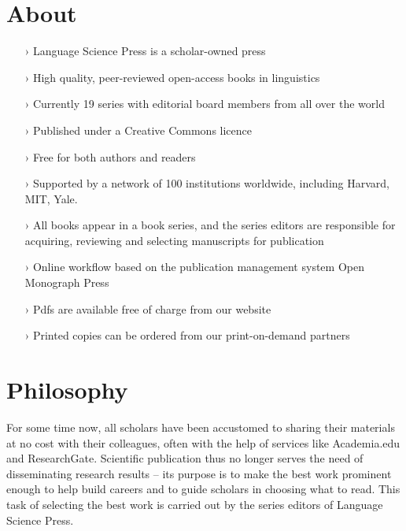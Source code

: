 \documentclass[
notumble,
nofoldmark,
]{leaflet}
\begin{document}
      
\newpage
\section{\sffamily\Large\bfseries About} 
\begin{itemize}  
\setlength{\itemsep}{-3pt} 
 \item[›] Language Science Press is a scholar-owned press
\item[›]  High quality, peer-reviewed open-access books in linguistics
\item[›] Currently 19 series with editorial board members from all over the world
 \item[›] Published under a Creative Commons licence
\item[›] Free for both authors and readers
 \item[›] Supported by a network of 100 institutions worldwide, including Harvard, MIT, Yale. 

 \item[›] All books appear in a book series, and the series editors are responsible for acquiring, reviewing and selecting manuscripts for publication
 \item[›] Online workflow based on the publication management system Open Monograph Press
 \item[›] Pdfs are available free of charge from our website 
 \item[›] Printed copies can be ordered from our print-on-demand partners
\end{itemize}
 
 \section{\sffamily\Large\bfseries Philosophy} 
 For some time now, all scholars have been accustomed to sharing their materials at no cost with their colleagues, often with the help of services like Academia.edu and ResearchGate. Scientific publication thus no longer serves the need of disseminating research results -- its purpose is to make the best work prominent enough to help build careers and to guide scholars in choosing what to read. This task of selecting the best work is carried out by the series editors of Language Science Press.
\end{document}
